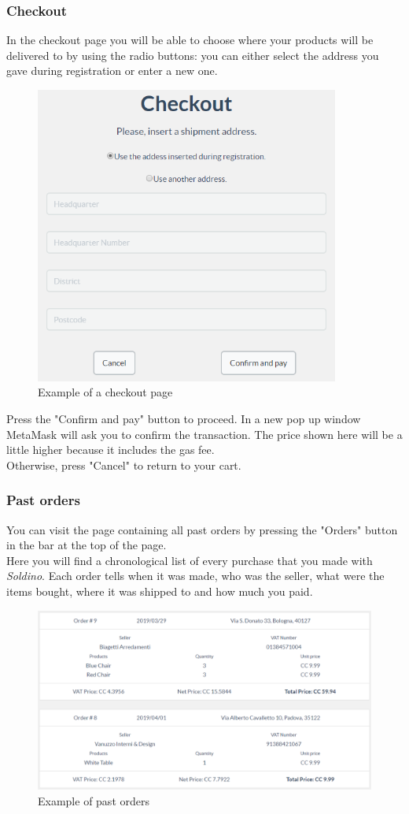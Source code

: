	\subsubsection{Checkout}
	In the checkout page you will be able to choose where your products will be 
	delivered to by using the radio buttons: you can either select the address you 
	gave during registration or enter a new one.\\
	\begin{figure}[H]
		\includegraphics[width=10cm]{res/images/checkout.png}
		\centering
		\caption{Example of a checkout page}
	\end{figure}
	\noindent Press the "Confirm and pay" button to proceed. In a new 
	pop up window MetaMask will ask you to confirm the transaction. The price 
	shown here will be a little higher because it includes the gas fee. \\
	Otherwise, press "Cancel" to return to your cart.
	\subsubsection{Past orders}
	You can visit the page containing all past orders by pressing the "Orders" 
	button in the bar at the top of the page.\\
	Here you will find a chronological list of every purchase that you made with 
	\textit{Soldino}. Each order tells when it was made, who was the seller, 
	what were the items bought, where it was shipped to and how much you paid.
	\begin{figure}[H]
		\includegraphics[width=15cm]{res/images/past_orders.png}
		\centering
		\caption{Example of past orders}
	\end{figure}
